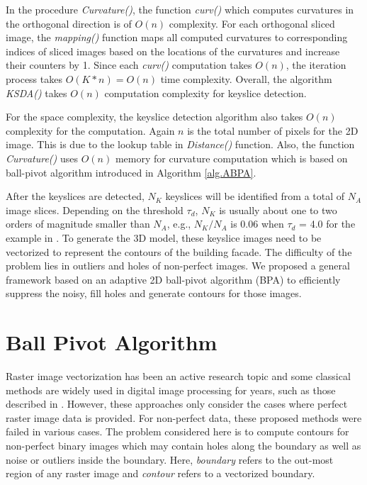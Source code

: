 In the procedure {\it Curvature()},
the function {\it curv()} which computes curvatures
in the orthogonal direction is of $O(n)$ complexity.
For each orthogonal sliced image,
the {\it mapping()} function maps all computed curvatures
to corresponding indices of sliced images based on the locations
of the curvatures and increase their counters by 1.
Since each {\it curv()} computation takes $O(n)$,
the iteration process takes $O(K*n) = O(n)$ time complexity.
Overall, the algorithm {\it KSDA()} takes $O(n)$
computation complexity for keyslice detection.

For the space complexity, the keyslice detection algorithm also takes
$O(n)$ complexity for the computation.
Again $n$ is the total number of pixels for the 2D image.
This is due to the lookup table in {\it Distance()} function.
Also, the function {\it Curvature()} uses $O(n)$ memory for
curvature computation which is based on ball-pivot algorithm
introduced in Algorithm \ref{alg.ABPA}.


After the keyslices are detected,
$N_K$ keyslices will be identified from a total of $N_A$ image slices.
Depending on the threshold $\tau_d$,
$N_K$ is usually about one to two orders of magnitude smaller than $N_A$,
e.g., $N_K/N_A$ is 0.06 when $\tau_d$ = 4.0
for the example in .
To generate the 3D model,
these keyslice images need to be vectorized to
represent the contours of the building facade.
The difficulty of the problem lies in outliers and holes of non-perfect images.
We proposed a general framework based on an adaptive 2D ball-pivot algorithm (BPA)
 to efficiently suppress the noisy,
fill holes and
generate contours for those images.

\section{Ball Pivot Algorithm}
\label{sec:BPA}




Raster image vectorization has been an active research topic
and some classical methods are widely used
in digital image processing for years,
such as those described in \cite{DP_RP,DP_WM, DP_LC,DP_AAKMT}.
However, these approaches only consider
the cases where perfect raster image data is provided.
For non-perfect data, these proposed methods were failed in various cases.
The problem considered here is to compute contours
for non-perfect binary images which may contain holes
along the boundary as well as noise or outliers
inside the boundary. Here, {\it boundary} refers to the
out-most region of any raster image and
{\it contour} refers to a vectorized boundary.


